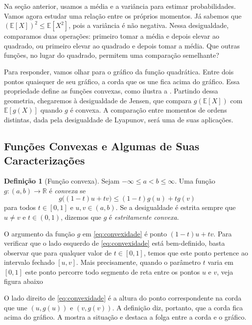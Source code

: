 \documentclass[12pt,portuguese]{article}
\theoremstyle{definition}
\newtheorem{definition}[definition]{Definição}
\theoremstyle{plainexercise}
\theoremstyle{starredexercise}
\theoremstyle{definition}
\begin{document}
Na seção anterior, usamos a média e a variância para estimar probabilidades.
Vamos agora estudar uma relação entre os próprios momentos. Já sabemos que
$(\mathbb{E}[X])^2\leqslant\mathbb{E}[X^2]$, pois a variância é não
negativa. Nessa desigualdade, comparamos duas operações: primeiro tomar a
média e depois elevar ao quadrado, ou primeiro elevar ao quadrado e depois
tomar a média. Que outras funções, no lugar do quadrado, permitem uma
comparação semelhante?

Para responder, vamos olhar para o gráfico da função quadrática. Entre dois
pontos quaisquer de seu gráfico, a corda que os une fica acima do gráfico.
Essa propriedade define as funções convexas, como ilustra a
. Partindo dessa geometria, chegaremos à
desigualdade de Jensen, que compara $g(\mathbb{E}[X])$ com
$\mathbb{E}[g(X)]$ quando $g$ é convexa. A comparação entre momentos de
ordens distintas, dada pela desigualdade de Lyapunov, será uma de suas
aplicações.

\subsection{Funções Convexas e Algumas de Suas Caracterizações}\label{subsec:convexidade-definicao}

\begin{definition}[Função convexa]\label{def:convexa}
Sejam $-\infty\leqslant a<b\leqslant\infty$. Uma função
$g\colon(a,b)\to\mathbb{R}$ é \emph{convexa} se
\begin{equation}\label{eq:convexidade}
g\bigl((1-t)u+tv\bigr)\leqslant(1-t)g(u)+tg(v)
\end{equation}
para todos $t\in[0,1]$ e $u,v\in(a,b)$. Se a desigualdade é estrita sempre que
$u\neq v$ e $t\in(0,1)$, dizemos que $g$ é \emph{estritamente convexa}.
\end{definition}

O argumento da função $g$ em \eqref{eq:convexidade} é ponto $(1-t)u+tv$.
Para verificar que o lado esquerdo de \eqref{eq:convexidade} está bem-definido,
basta observar que para qualquer valor de $t\in [0,1]$, temos que este ponto pertence
ao intervalo fechado $[u,v]$. Mais precisamente,
quando o parâmetro $t$ varia em $[0,1]$
este ponto percorre todo segmento de reta entre os pontos $u$ e $v$, veja figura abaixo


O lado direito de \eqref{eq:convexidade} é a altura do ponto
correspondente na corda que une $(u,g(u))$ e $(v,g(v))$. A definição diz,
portanto, que a corda fica acima do gráfico. A 
mostra a situação e destaca a folga entre a corda e o gráfico.
\end{document}
